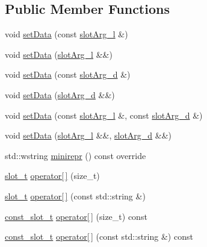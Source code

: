 \subsection*{Public Member Functions}
\begin{DoxyCompactItemize}
\item 
void \mbox{\hyperlink{classebml_1_1ebmlMultiSlot_afc98f8c3edbde97ecab662c8e9497335}{set\+Data}} (const \mbox{\hyperlink{namespaceebml_ae432575dfbb3e141ce897442794f0ca5}{slot\+Arg\+\_\+l}} \&)
\item 
void \mbox{\hyperlink{classebml_1_1ebmlMultiSlot_aa849380ecfe72c8e13b0ec62ce1eee5d}{set\+Data}} (\mbox{\hyperlink{namespaceebml_ae432575dfbb3e141ce897442794f0ca5}{slot\+Arg\+\_\+l}} \&\&)
\item 
void \mbox{\hyperlink{classebml_1_1ebmlMultiSlot_a26efa69855cf4e6ce5d220a90f5bc55b}{set\+Data}} (const \mbox{\hyperlink{namespaceebml_a4317d4c495715eced3ed448c2d05caeb}{slot\+Arg\+\_\+d}} \&)
\item 
void \mbox{\hyperlink{classebml_1_1ebmlMultiSlot_ae5c436b93c6f810bceda911890606e88}{set\+Data}} (\mbox{\hyperlink{namespaceebml_a4317d4c495715eced3ed448c2d05caeb}{slot\+Arg\+\_\+d}} \&\&)
\item 
void \mbox{\hyperlink{classebml_1_1ebmlMultiSlot_a8a54cc97efcae5cad451703f1e95f82e}{set\+Data}} (const \mbox{\hyperlink{namespaceebml_ae432575dfbb3e141ce897442794f0ca5}{slot\+Arg\+\_\+l}} \&, const \mbox{\hyperlink{namespaceebml_a4317d4c495715eced3ed448c2d05caeb}{slot\+Arg\+\_\+d}} \&)
\item 
void \mbox{\hyperlink{classebml_1_1ebmlMultiSlot_a762c96dfeff8e877b6c9d40fdda6d0d2}{set\+Data}} (\mbox{\hyperlink{namespaceebml_ae432575dfbb3e141ce897442794f0ca5}{slot\+Arg\+\_\+l}} \&\&, \mbox{\hyperlink{namespaceebml_a4317d4c495715eced3ed448c2d05caeb}{slot\+Arg\+\_\+d}} \&\&)
\item 
std\+::wstring \mbox{\hyperlink{classebml_1_1ebmlMultiSlot_a3a2407406cd68f27d974cc18223c86c0}{minirepr}} () const override
\item 
\mbox{\hyperlink{classebml_1_1slot__t}{slot\+\_\+t}} \mbox{\hyperlink{classebml_1_1ebmlMultiSlot_a9edb99f1fd34d4ba765fa5f1266026ec}{operator\mbox{[}$\,$\mbox{]}}} (size\+\_\+t)
\item 
\mbox{\hyperlink{classebml_1_1slot__t}{slot\+\_\+t}} \mbox{\hyperlink{classebml_1_1ebmlMultiSlot_aee35de0e28c6e7916951d6094576b639}{operator\mbox{[}$\,$\mbox{]}}} (const std\+::string \&)
\item 
\mbox{\hyperlink{classebml_1_1const__slot__t}{const\+\_\+slot\+\_\+t}} \mbox{\hyperlink{classebml_1_1ebmlMultiSlot_a82a094d9159d4c527ac265dbb0852905}{operator\mbox{[}$\,$\mbox{]}}} (size\+\_\+t) const
\item 
\mbox{\hyperlink{classebml_1_1const__slot__t}{const\+\_\+slot\+\_\+t}} \mbox{\hyperlink{classebml_1_1ebmlMultiSlot_ac8b464bc8f1aecd2f491217448d547e8}{operator\mbox{[}$\,$\mbox{]}}} (const std\+::string \&) const
\end{DoxyCompactItemize}
